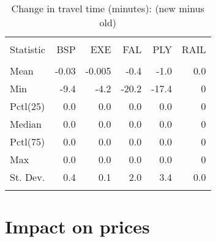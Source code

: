 \documentclass{article}\usepackage[]{graphicx}\usepackage[]{color}
\begin{document}
\begin{table}[!htbp] \centering 
  \caption{Change in travel time (minutes): (new minus old)} 
  \label{} 
\small 
\begin{tabular}{@{\extracolsep{2pt}}lD{.}{.}{-1} D{.}{.}{-1} D{.}{.}{-1} D{.}{.}{-1} D{.}{.}{-1} } 
\\[-1.8ex]\hline 
\hline \\[-1.8ex] 
Statistic & BSP & EXE & FAL & PLY & RAIL \\ 
\hline \\[-1.8ex] 
Mean & -0.03 & -0.005 & -0.4 & -1.0 & 0.0 \\ 
Min & -9.4 & -4.2 & -20.2 & -17.4 & 0 \\ 
Pctl(25) & 0.0 & 0.0 & 0.0 & 0.0 & 0 \\ 
Median & 0.0 & 0.0 & 0.0 & 0.0 & 0 \\ 
Pctl(75) & 0.0 & 0.0 & 0.0 & 0.0 & 0 \\ 
Max & 0.0 & 0.0 & 0.0 & 0.0 & 0 \\ 
St. Dev. & 0.4 & 0.1 & 2.0 & 3.4 & 0.0 \\ 
\hline \\[-1.8ex] 
\end{tabular} 
\end{table} 

\pagebreak
\section{Impact on prices}
\end{document}

